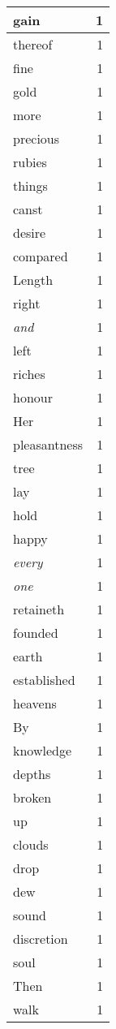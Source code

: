 \begin{center}
\begin{longtable}{l|r}
gain & 1\\ \hline 
thereof & 1\\ \hline 
fine & 1\\ \hline 
gold & 1\\ \hline 
more & 1\\ \hline 
precious & 1\\ \hline 
rubies & 1\\ \hline 
things & 1\\ \hline 
canst & 1\\ \hline 
desire & 1\\ \hline 
compared & 1\\ \hline 
Length & 1\\ \hline 
right & 1\\ \hline 
\emph{and} & 1\\ \hline 
left & 1\\ \hline 
riches & 1\\ \hline 
honour & 1\\ \hline 
Her & 1\\ \hline 
pleasantness & 1\\ \hline 
tree & 1\\ \hline 
lay & 1\\ \hline 
hold & 1\\ \hline 
happy & 1\\ \hline 
\emph{every} & 1\\ \hline 
\emph{one} & 1\\ \hline 
retaineth & 1\\ \hline 
founded & 1\\ \hline 
earth & 1\\ \hline 
established & 1\\ \hline 
heavens & 1\\ \hline 
By & 1\\ \hline 
knowledge & 1\\ \hline 
depths & 1\\ \hline 
broken & 1\\ \hline 
up & 1\\ \hline 
clouds & 1\\ \hline 
drop & 1\\ \hline 
dew & 1\\ \hline 
sound & 1\\ \hline 
discretion & 1\\ \hline 
soul & 1\\ \hline 
Then & 1\\ \hline 
walk & 1\\ \hline 

\end{longtable}
\end{center}
